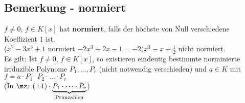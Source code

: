 	\subsection{Bemerkung - normiert}
	
	$f\neq 0$, $f\in K[x]$ hat \textbf{normiert}, falls der höchste von Null verschiedene Koeffizient $1$ ist.\\
	($x^7-3x^3+1$ normiert $-2x^3+2x-1=-2(x^3-x+\frac{1}{2}$ nicht normiert.\\
	Es gilt: Ist $f\neq 0$, $f\in K[x]$, so existieren eindeutig bestimmte norminierte irrduzible Polynome $P_1,...,P_r$ (nicht notwendig verschieden) und $a\in K$ mit $f=a\cdot P_1\cdot P_2\cdot\dots\cdot P_r$\\
	(In $\mz$: $(\pm 1)\cdot \underbrace{P_1\cdot\dots\cdot P_r}_{\mbox{\scriptsize Primzahlen}}$)

